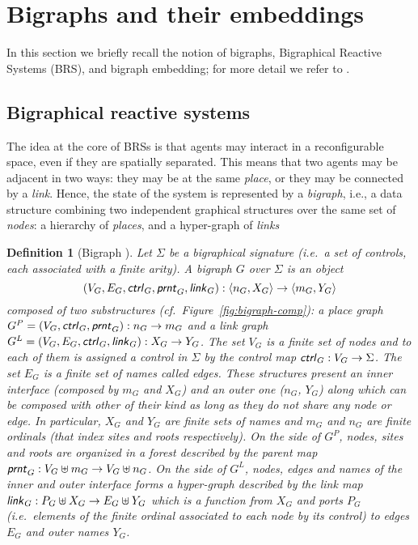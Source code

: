 \documentclass[a4paper,english,10pt]{article}
\theoremstyle{plain}\newtheorem{theorem}{Theorem}
\theoremstyle{plain}\newtheorem{corollary}[theorem]{Corollary}
\theoremstyle{plain}\newtheorem{proposition}[theorem]{Proposition}
\theoremstyle{plain}\newtheorem{lemma}[theorem]{Lemma}
\theoremstyle{plain}\newtheorem{definition}{Definition}
\theoremstyle{plain}\newtheorem{remark}{Remark}
\theoremstyle{plain}\newtheorem{example}[remark]{Example}
\newcommand{\?}[1]{}
\newcommand{\face}[1]{\langle #1 \rangle}
\newcommand{\prnt}{\textsf{\textit{prnt}}}
\newcommand{\ctrl}{\textsf{\textit{ctrl}}}
\newcommand{\link}{\textsf{\textit{link}}}
\begin{document}
\section{Bigraphs and their embeddings}
\label{sec:prelim}
In this section we briefly recall the notion of bigraphs, Bigraphical
Reactive Systems (BRS), and bigraph embedding; for more detail we
refer to \cite{milner:bigraphbook}.


\subsection{Bigraphical reactive systems}
\label{sec:brs}
The idea at the core of BRSs is that agents may interact in a
reconfigurable space, even if they are spatially separated.  This
means that two agents may be adjacent in two ways: they may be at the
same \emph{place}, or they may be connected by a \emph{link}.  Hence,
the state of the system is represented by a \emph{bigraph}, i.e., a
data structure combining two independent graphical structures over the
same set of \emph{nodes}: a hierarchy of \emph{places}, and a
hyper-graph of \emph{links}

\begin{definition}[Bigraph {\cite[Def.~2.3]{milner:bigraphbook}}]
	Let $\Sigma$ be a bigraphical signature (i.e.~a set of
	\emph{controls}, each associated with a finite arity).
	A \emph{bigraph} $G$ over $\Sigma$ is an object
	\[
		(V_G, E_G, \ctrl_G, \prnt_G, \link_G):\face{n_G,X_G}\to\face{m_G,Y_G}
	\]
	composed of two substructures (cf.~Figure~\ref{fig:bigraph-comp}): 
	a \emph{place graph}  $G^P=(V_G, \ctrl_G, \prnt_G):{n_G\to m_G}$ and a
	\emph{link graph} $G^L=(V_G,E_G,\ctrl_G,\link_G):{X_G\to Y_G}$.
	The set $V_G$ is a finite set of nodes and to each of them is assigned a
	control in $\Sigma$ by the \emph{control map} $\ctrl_G : V_G\to \Sigma$.
	The set $E_G$ is a finite set of names called \emph{edges}.
These structures present an inner interface (composed by $m_G$ and 
	$X_G$) and an outer one ($n_G$, $Y_G$) along which can be composed with
	other of their kind as long as they do not share any
	node or edge. In particular, $X_G$ and $Y_G$ are finite sets
	of names and $m_G$ and $n_G$ are finite ordinals (that index \emph{sites} and \emph{roots} respectively).
On the side of $G^P$, nodes, sites and roots are organized in
	a forest described by the \emph{parent map} $\prnt_G : V_G 
	\uplus m_G \to V_G \uplus n_G$.
On the side of $G^L$, nodes, edges and names of the inner and outer
	interface forms a hyper-graph described by the \emph{link map} 
	$\link_G : P_G\uplus X_G \to E_G \uplus Y_G$ which is a function from $X_G$ and ports $P_G$ (i.e.~elements of 
	the finite ordinal associated to each node by its control) to 
	edges $E_G$ and outer names $Y_G$.
\end{definition}
\end{document}
